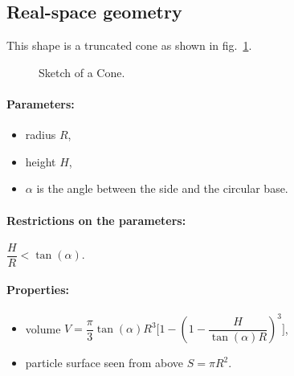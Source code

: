 \subsection{Real-space geometry}
This shape is a truncated cone as shown in fig.~\ref{fig:cone}. 

\begin{figure}[ht]
\hfill
{}
\hfill
{}
\hfill
\caption{Sketch of a Cone.}
\label{fig:cone}
\end{figure}

\paragraph{Parameters:}
\begin{itemize}
\item radius $R$,
\item height $H$,
\item $\alpha$ is the angle between the side and the circular base.
\end{itemize}

\paragraph{Restrictions on the parameters:} $\dfrac{H}{R}< \tan(\alpha)$.

\paragraph{Properties:}
\begin{itemize}
\item volume $V = \dfrac{\pi}{3} \tan(\alpha) R^3 \Big[ 
            1 - (1- \dfrac{H}{\tan(\alpha)R})^3\Big]$,
\item  particle surface seen from above $S=\pi R^2$.
\end{itemize}

